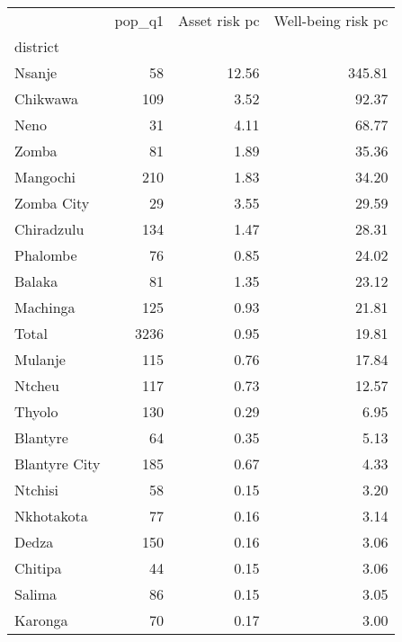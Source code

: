 \begin{tabular}{lrrr}
\toprule
{} &  pop\_q1 &  Asset risk pc &  Well-being risk pc \\
district      &         &                &                     \\
\midrule
Nsanje        &      58 &          12.56 &              345.81 \\
Chikwawa      &     109 &           3.52 &               92.37 \\
Neno          &      31 &           4.11 &               68.77 \\
Zomba         &      81 &           1.89 &               35.36 \\
Mangochi      &     210 &           1.83 &               34.20 \\
Zomba City    &      29 &           3.55 &               29.59 \\
Chiradzulu    &     134 &           1.47 &               28.31 \\
Phalombe      &      76 &           0.85 &               24.02 \\
Balaka        &      81 &           1.35 &               23.12 \\
Machinga      &     125 &           0.93 &               21.81 \\
Total         &    3236 &           0.95 &               19.81 \\
Mulanje       &     115 &           0.76 &               17.84 \\
Ntcheu        &     117 &           0.73 &               12.57 \\
Thyolo        &     130 &           0.29 &                6.95 \\
Blantyre      &      64 &           0.35 &                5.13 \\
Blantyre City &     185 &           0.67 &                4.33 \\
Ntchisi       &      58 &           0.15 &                3.20 \\
Nkhotakota    &      77 &           0.16 &                3.14 \\
Dedza         &     150 &           0.16 &                3.06 \\
Chitipa       &      44 &           0.15 &                3.06 \\
Salima        &      86 &           0.15 &                3.05 \\
Karonga       &      70 &           0.17 &                3.00 \\

\end{tabular}
